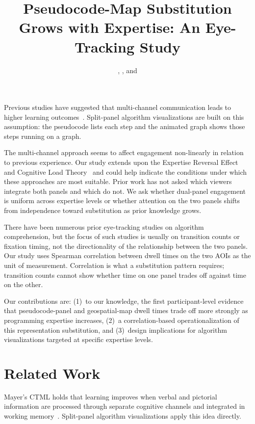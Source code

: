 \documentclass[journal]{vgtc}
\title{Pseudocode-Map Substitution Grows with Expertise: An Eye-Tracking Study}
\author{%
  \authororcid{Razieh Fathi}{0000-0000-0000-0000},
  \authororcid{[SECOND AUTHOR]}{0000-0000-0000-0000},
  and
  \authororcid{Ian Handy}{0000-0000-0000-0000}
}
\begin{document}

\maketitle

Previous studies have suggested that multi-channel communication leads to
higher learning outcomes~\cite{Mayer2001Multimedia}. Split-panel algorithm
visualizations are built on this assumption: the pseudocode lists each step and
the animated graph shows those steps running on a graph.

The multi-channel approach seems to affect engagement non-linearly in relation
to previous experience. Our study extends upon the Expertise Reversal Effect
and Cognitive Load Theory~\cite{Kalyuga2003Expertise,Sweller1988Cognitive}
and could help indicate the conditions under which these approaches are most
suitable. Prior work has not asked which viewers integrate both panels and
which do not.
We ask whether dual-panel engagement is uniform across expertise levels or
whether attention on the two panels shifts from independence toward
substitution as prior knowledge grows.

There have been numerous prior eye-tracking studies on algorithm comprehension,
but the focus of such studies is usually on transition counts or fixation
timing, not the directionality of the relationship between the two panels.
Our study uses Spearman correlation between dwell times on the two AOIs as
the unit of measurement. Correlation is what a substitution pattern requires;
transition counts cannot show whether time on one panel trades off against
time on the other.

Our contributions are: (1)~to our knowledge, the first participant-level
evidence that pseudocode-panel and geospatial-map dwell times trade off
more strongly as programming expertise increases, (2)~a correlation-based
operationalization of this representation substitution, and (3)~design
implications for algorithm visualizations targeted at specific expertise
levels.


\section{Related Work}

Mayer's CTML holds that learning improves when verbal and pictorial information
are processed through separate cognitive channels and integrated in working
memory~\cite{Mayer2001Multimedia}. Split-panel algorithm visualizations apply
this idea directly.
\end{document}
